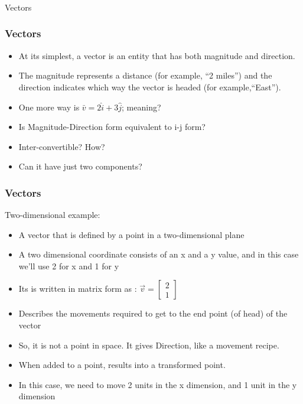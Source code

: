 \begin{frame}[fragile]\frametitle{}
\begin{center}
{\Large Vectors}
\end{center}
\end{frame}


 \begin{frame}[fragile] \frametitle{Vectors}

\begin{itemize}

\item At its simplest, a vector is an entity that has both magnitude and direction. 
\item The magnitude represents a distance (for example, ``2 miles'') and the direction indicates which way the vector is headed (for example,``East''). 
\item One more way is $\bar{v} = 2\hat{i} + 3\hat{j}$; meaning?
\item Is Magnitude-Direction form equivalent to i-j form?
\item Inter-convertible? How?
\item Can it have just two components?
\end{itemize}

\end{frame}




 \begin{frame}[fragile] \frametitle{Vectors}
Two-dimensional example:
\begin{itemize}

\item A vector that is defined by a point in a two-dimensional plane
\item A two dimensional coordinate consists of an x and a y value, and in this case we'll use 2 for x and 1 for y
\item Its is written in matrix form as : $\vec{v} = \begin{bmatrix}2 \\ 1 \end{bmatrix}$
\item Describes the movements required to get to the end point (of head) of the vector 
\item So, it is not a point in space. It gives Direction, like a movement recipe. 
\item When added to a point, results into a transformed point.
\item In this case, we need to move 2 units in the x dimension, and 1 unit in the y dimension
\end{itemize}

\end{frame}

